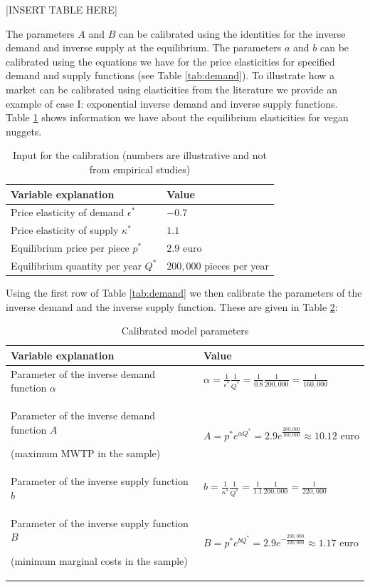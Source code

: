 \documentclass[
]{book}
\begin{document}
{[}INSERT TABLE HERE{]}

The parameters \(A\) and \(B\) can be calibrated using the identities for the inverse demand and inverse supply at the equilibrium. The parameters \(a\) and \(b\) can be calibrated using the equations we have for the price elasticities for specified demand and supply functions (see Table \ref{tab:demand}).
To illustrate how a market can be calibrated using elasticities from the literature we provide an example of case I: exponential inverse demand and inverse supply functions. Table \ref{tab:calibration} shows information we have about the equilibrium elasticities for vegan nuggets.

\begin{table}

\caption{\label{tab:calibration}Input for the calibration (numbers are illustrative and not from empirical studies)}
\centering
\begin{tabular}[t]{ll}
\toprule
Variable explanation & Value\\
\midrule
Price elasticity of demand $\epsilon^\ast$ & $-0.7$\\
Price elasticity of supply $\kappa^\ast$ & $1.1$\\
Equilibrium price per piece $p^\ast$ & $2.9$ euro\\
Equilibrium quantity per year $Q^\ast$ & $200,000$ pieces per year\\
\bottomrule
\end{tabular}
\end{table}

Using the first row of Table \ref{tab:demand} we then calibrate the parameters of the inverse demand and the inverse supply function. These are given in Table \ref{tab:modelparameters}:

\begin{table}

\caption{\label{tab:modelparameters}Calibrated model parameters}
\centering
\begin{tabular}[t]{ll}
\toprule
Variable explanation & Value\\
\midrule
Parameter of the inverse demand function $\alpha$ & $\alpha = \frac{1}{\epsilon^\ast}\frac{1}{Q^\ast} = \frac{1}{0.8}\frac{1}{200,000} = \frac{1}{160,000}$\\
Parameter of the inverse demand function $A$

(maximum MWTP in the sample) & $A = p^\ast e^{\alpha Q^\ast} = 2.9 e^{\frac{200,000}{160,000}} \approx 10.12 \text{ euro}$\\
Parameter of the inverse supply function $b$ & $b = \frac{1}{\kappa^\ast}\frac{1}{Q^{\ast}} = \frac{1}{1.1}\frac{1}{200,000} = \frac{1}{220,000}$\\
Parameter of the inverse supply function $B$

(minimum marginal costs in the sample) & $B = p^\ast e^{b Q^\ast} = 2.9 e^{-\frac{200,000}{220,000}} \approx 1.17 \text{ euro}$\\
\bottomrule
\end{tabular}
\end{table}
\end{document}
